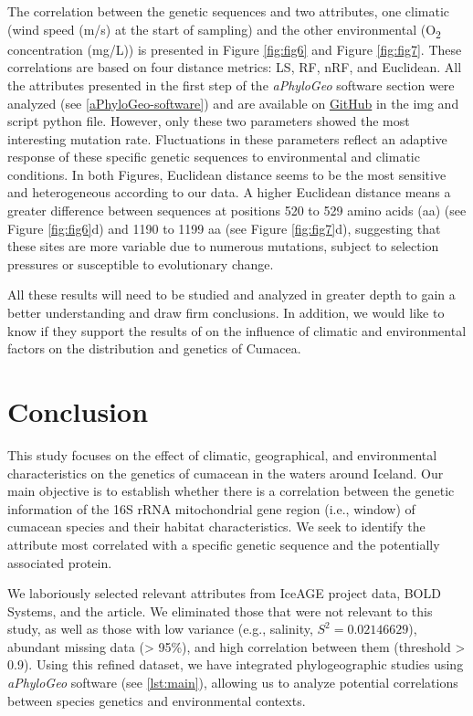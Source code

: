 The correlation between the genetic sequences and two attributes, one climatic (wind speed (m/s) at the start of sampling) and the other environmental (O\textsubscript{2} concentration (mg/L)) is presented in Figure \ref{fig:fig6} and Figure \ref{fig:fig7}. These correlations are based on four distance metrics: LS, RF, nRF, and Euclidean. All the attributes presented in the first step of the \textit{aPhyloGeo} software section were analyzed (see \autoref{aPhyloGeo-software}) and are available on \href{https://github.com/tahiri-lab/Cumacea_aPhyloGeo}{GitHub} in the img and script python file. However, only these two parameters showed the most interesting mutation rate. Fluctuations in these parameters reflect an adaptive response of these specific genetic sequences to environmental and climatic conditions. In both Figures, Euclidean distance seems to be the most sensitive and heterogeneous according to our data. A higher Euclidean distance means a greater difference between sequences at positions 520 to 529 amino acids (aa) (see Figure \ref{fig:fig6}d) and 1190 to 1199 aa (see Figure \ref{fig:fig7}d), suggesting that these sites are more variable due to numerous mutations, subject to selection pressures or susceptible to evolutionary change. 

All these results will need to be studied and analyzed in greater depth to gain a better understanding and draw firm conclusions. In addition, we would like to know if they support the results of \citep{uhlir_adding_2021} on the influence of climatic and environmental factors on the distribution and genetics of Cumacea.

\section{Conclusion}\label{conclusion}
This study focuses on the effect of climatic, geographical, and environmental characteristics on the genetics of cumacean in the waters around Iceland. Our main objective is to establish whether there is a  correlation between the genetic information of the 16S rRNA mitochondrial gene region (i.e., window) of cumacean species and their habitat characteristics. We seek to identify the attribute most correlated with a specific genetic sequence and the potentially associated protein.

We laboriously selected relevant attributes from IceAGE project data, BOLD Systems, and the \citep{uhlir_adding_2021} article. We eliminated those that were not relevant to this study, as well as those with low variance (e.g., salinity, $S^2 = 0.02146629$), abundant missing data (> 95\%), and high correlation between them (threshold > 0.9). Using this refined dataset, we have integrated phylogeographic studies using \textit{aPhyloGeo} software (see \autoref{lst:main}), allowing us to analyze potential correlations between species genetics and environmental contexts.


